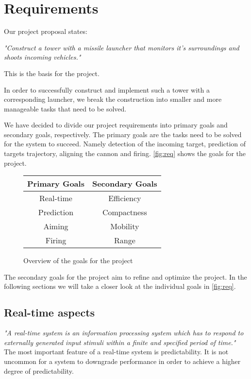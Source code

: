 \section{Requirements}
Our project proposal states: 

\emph{"Construct a tower with a missile launcher that monitors it's surroundings and shoots incoming vehicles."} 

This is the basis for the project.

In order to successfully construct and implement such a tower with a corresponding launcher, we break the construction into smaller and more manageable tasks that need to be solved.

We have decided to divide our project requirements into primary goals and secondary goals, respectively. The primary goals are the tasks need to be solved for the system to succeed. Namely detection of the incoming target, prediction of targets trajectory, aligning the cannon and firing. \autoref{fig:req} shows the goals for the project.

\begin{figure}[hptb]
\centering
\begin{tabular}{ c c}
\textbf{Primary Goals} & \textbf{Secondary Goals}\\ [0.5ex]
\hline
Real-time &   Efficiency\\
Prediction&	Compactness\\
Aiming	  &	Mobility\\
Firing    &   Range\\[1ex]
\hline
\end{tabular}
\caption{Overview of the goals for the project}
\label{fig:req}
\end{figure}

The secondary goals for the project aim to refine and optimize the project. 
In the following sections we will take a closer look at the individual goals in \autoref{fig:req}.


\subsection{Real-time aspects} %
\label{sub:real_time_aspects}
\emph{"A real-time system is an information processing system which has to
respond to externally generated input stimuli within a finite and specified
period of time."}\\

The most important feature of a real-time system is predictability. It is not uncommon for a system to downgrade performance in order to achieve a higher degree of predictability. 


